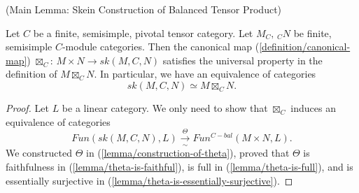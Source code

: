 \begin{lemma} (Main Lemma: Skein Construction of Balanced Tensor Product) \label{lemma/main-lemma}

  \noindent Let $C$ be a finite, semisimple, pivotal tensor category. Let
  $M_{C}, \, {}_{C}N$ be finite, semisimple $C$-module categories. Then the
  canonical map (\ref{definition/canonical-map}) $\boxtimes_{C}$:
  $M \times N \to sk(M,C,N)$ satisfies the universal property in the
  definition of $M \boxtimes_{C} N$. In particular, we have an equivalence of
  categories
  \[
    sk(M,C,N) \simeq M \boxtimes_{C} N.
  \]
\end{lemma}

\begin{proof}
  Let $L$ be a linear category. We only need to show that $\boxtimes_{C}$
  induces an equivalence of categories
  \[
    Fun(sk(M,C,N), L) \xrightarrow[\sim]{\Theta} Fun^{C-bal}(M \times N, L).
  \]
  We constructed $\Theta$ in (\ref{lemma/construction-of-theta}), proved that
  $\Theta$ is faithfulness in (\ref{lemma/theta-is-faithful}), is full in
  (\ref{lemma/theta-is-full}), and is essentially surjective in
  (\ref{lemma/theta-is-essentially-surjective}).
\end{proof}


